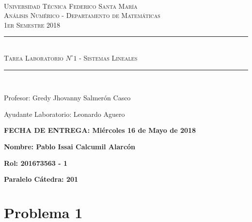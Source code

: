 \documentclass[10pt,twoside]{article}
\newcommand{\HRule}{\rule{\linewidth}{0.25mm}}
\begin{document}
\begin{center}
~\\[-1.5cm]

\textsc{ \scalebox{1} Universidad Técnica Federico Santa María}\\[0.1cm]
\textsc{ \scalebox{1} Análisis Numérico - Departamento de Matemáticas}\\[0.1cm]
\textsc{1er Semestre 2018\\}

\HRule \\[0.1cm]
{\Large\textsc{ Tarea Laboratorio $N^{\circ} 1$ - Sistemas Lineales\\}}
\HRule \\[0.1cm]
\vspace{3mm}

\vspace{0.1mm}
Profesor: Gredy Jhovanny Salmerón Casco\\
\vspace{0.1mm}

\vspace{0.1mm}
Ayudante Laboratorio: Leonardo Aguero\\
\vspace{3mm}

\textbf{FECHA DE ENTREGA: Miércoles 16 de Mayo de 2018\\} 

\end{center}
\begin{flushleft}

\vspace{3mm}
\textbf{Nombre: Pablo Issai Calcumil Alarcón\\}
\vspace{3mm}

\textbf{Rol: 201673563 - 1\\}
\vspace{3mm}

\textbf{Paralelo Cátedra: 201\\}
\vspace{3mm}
\end{flushleft}

\section{Problema 1}
\end{document}
